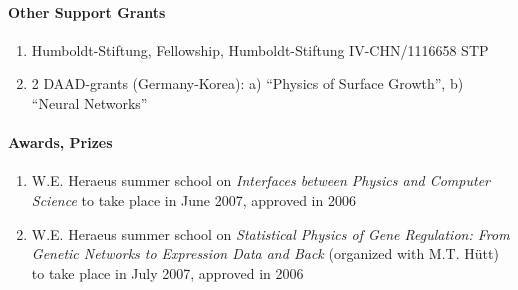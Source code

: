 \paragraph{Other Support Grants}
\begin{enumerate}
\item Humboldt-Stiftung, Fellowship, Humboldt-Stiftung
IV-CHN/1116658 STP
\item 2 DAAD-grants (Germany-Korea): a) ``Physics of Surface Growth'', b) ``Neural Networks''
\end{enumerate}


\paragraph{Awards, Prizes}
\begin{enumerate}
\item W.E. Heraeus summer school on {\it Interfaces between Physics
and Computer Science} to take place in June 2007, approved in 2006
\item W.E. Heraeus summer school on {\it Statistical Physics of
Gene Regulation: From Genetic Networks to Expression Data and Back
} (organized with M.T. H\"utt) to take place in July 2007, approved
in 2006
\end{enumerate}

\nocite{ortmanns0M}
\nocite{ortmanns1M}
\nocite{ortmanns2M}
\nocite{ortmanns3M}
\nocite{ortmanns4M}
\nocite{ortmanns5M}
\nocite{ortmanns6M}
\nocite{vilone1M}
